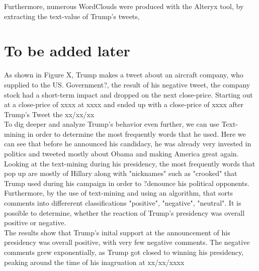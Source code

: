 \documentclass{article}
\begin{document}
Furthermore, numerous WordClouds were produced with the Alteryx tool, by extracting the text-value of Trump's tweets, 



\section{To be added later}

As shown in Figure X, Trump makes a tweet about an aircraft company, who supplied to the US. Government?, the result of his negative tweet, the company stock had a short-term impact and dropped on the next close-price. Starting out at a close-price of xxxx at xxxx and ended up with a close-price of xxxx after Trump's Tweet the xx/xx/xx \\

To dig deeper and analyze Trump's behavior even further, we can use Text-mining in order to determine the most frequently words that he used. Here we can see that before he announced his candidacy, he was already very invested in politics and tweeted mostly about Obama and making America great again. Looking at the text-mining during his presidency, the most frequently words that pop up are mostly of Hillary along with "nicknames" such as "crooked" that Trump used during his campaign in order to ?denounce his political opponents.  \\


Furthermore, by the use of text-mining and using an algorithm, that sorts comments into differerent classifications "positive", "negative", "neutral". It is possible to determine, whether the reaction of Trump's presidency was overall positive or negative. \\

The results show that Trump's inital support at the announcement of his presidency was overall positive, with very few negative comments.  The negative comments grew exponentially, as Trump got closed to winning his presidency, peaking around the time of his inagruation at xx/xx/xxxx




\end{document}
